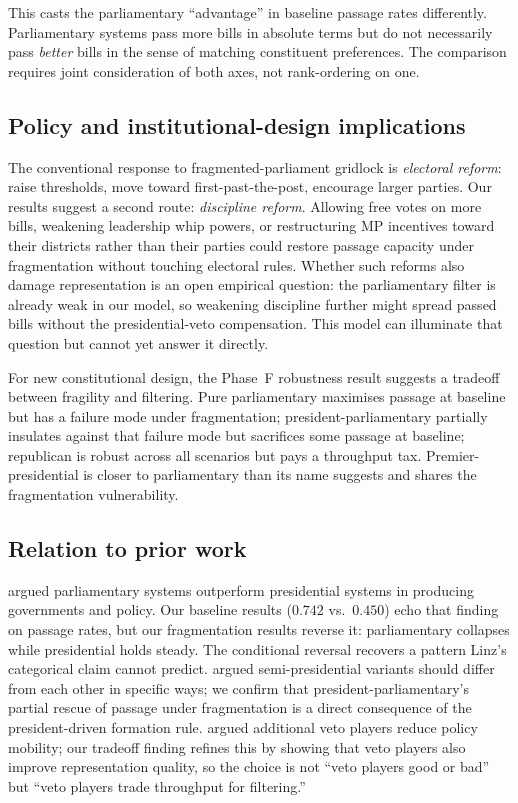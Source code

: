\documentclass[11pt]{article}
\begin{document}
This casts the parliamentary ``advantage'' in baseline passage rates
differently. Parliamentary systems pass more bills in absolute terms but
do not necessarily pass \emph{better} bills in the sense of matching
constituent preferences. The comparison requires joint consideration of
both axes, not rank-ordering on one.

\subsection{Policy and institutional-design implications}

The conventional response to fragmented-parliament gridlock is
\emph{electoral reform}: raise thresholds, move toward first-past-the-post,
encourage larger parties. Our results suggest a second route:
\emph{discipline reform}. Allowing free votes on more bills, weakening
leadership whip powers, or restructuring MP incentives toward their
districts rather than their parties could restore passage capacity under
fragmentation without touching electoral rules. Whether such reforms also
damage representation is an open empirical question: the parliamentary
filter is already weak in our model, so weakening discipline further might
spread passed bills without the presidential-veto compensation. This model
can illuminate that question but cannot yet answer it directly.

For new constitutional design, the Phase~F robustness result suggests a
tradeoff between fragility and filtering. Pure parliamentary maximises
passage at baseline but has a failure mode under fragmentation;
president-parliamentary partially insulates against that failure mode but
sacrifices some passage at baseline; republican is robust across all
scenarios but pays a throughput tax. Premier-presidential is closer to
parliamentary than its name suggests and shares the fragmentation
vulnerability.

\subsection{Relation to prior work}

\citet{linz1990} argued parliamentary systems outperform presidential
systems in producing governments and policy. Our baseline results
($0.742$ vs.\ $0.450$) echo that finding on passage rates, but our
fragmentation results reverse it: parliamentary collapses while presidential
holds steady. The conditional reversal recovers a pattern Linz's categorical
claim cannot predict. \citet{shugart1992} argued semi-presidential variants
should differ from each other in specific ways; we confirm that
president-parliamentary's partial rescue of passage under fragmentation is
a direct consequence of the president-driven formation rule. \citet{tsebelis2002}
argued additional veto players reduce policy mobility; our tradeoff finding
refines this by showing that veto players also improve representation
quality, so the choice is not ``veto players good or bad'' but ``veto
players trade throughput for filtering.''
\end{document}
